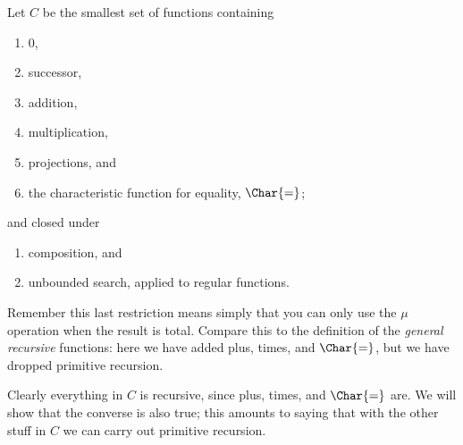 \documentclass[../../../include/open-logic-section]{subfiles}
\begin{document}

Let $C$ be the smallest set of functions containing
\begin{enumerate}
\item $0$,
\item successor,
\item addition,
\item multiplication,
\item projections, and
\item the characteristic function for equality, $\Char{=}$;
\end{enumerate}
and closed under
\begin{enumerate}
\item composition, and
\item unbounded search, applied to regular
functions.
\end{enumerate}
Remember this last restriction means simply that you can only use the
$\mu$ operation when the result is total. Compare this to the
definition of the \emph{general recursive} functions: here we have
added plus, times, and $\Char{=}$, but we have dropped primitive
recursion.

Clearly everything in $C$ is recursive, since plus, times,
and $\Char{=}$ are. We will show that the converse is also true; this
amounts to saying that with the other stuff in $C$ we can carry out
primitive recursion.
\end{document}
